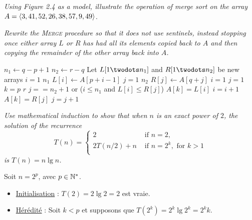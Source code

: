 \begin{description}
   {\itshape Using Figure 2.4 as a model, illustrate the operation of merge sort on the array $A =\\ \langle 3, 41, 52, 26, 38, 57, 9, 49\rangle$}.

    \begin{exrev}
      
    \end{exrev}

   {\itshape Rewrite the \textsc{Merge} procedure so that it does not use sentinels, instead stopping once either array $L$ or $R$ has had all its elements copied back to $A$ and then copying the remainder of the other array back into $A$.}

    \begin{ex}
      \begin{codebox}
        \li $n_1 \gets q - p + 1$
        \li $n_2 \gets r - q$
        \li Let $L[1\twodots n_1]$ and $R[1\twodots n_2]$ be new arrays
        \li \For $i = 1$ \To $n_1$ \Do
        \li $L[i] \gets A[p + i -1]$ \End
        \li \For $j = 1$ \To $n_2$ \Do
        \li $R[j] \gets A[q + j]$ \End
        \li $i = 1$
        \li $j = 1$
        \li \For $k = p$ \To $r$ \Do
        \li \If $ j == n_2+1$ or  ($i \le n_1$ and $L[i] \le R[j]$) \Then
        \li $A[k] = L[i]$
        \li $i = i+1$
        \li \Else 
        \li $A[k] = R[j]$
        \li $j = j+1$\End \End
      \end{codebox}
    \end{ex}

   {\itshape Use mathematical induction to show that when $n$ is an exact power of $2$, the solution of the recurrence 
    $$T(n) = \left\{
      \begin{array}{ll}
        2 & \text{ if } n = 2,\\
        2T(n/2)+n & \text{ if }n = 2^k, \text{ for } k> 1\\
      \end{array}
    \right.$$
  is $T(n) = n\lg n$.}

    \begin{ex}
      Soit $n = 2^p$, avec $p \in \mathbb{N}^*$.
      \begin{itemize}
        \item \ul{Initialisation} : $T(2) = 2\lg 2 = 2$ est vraie.
        \item \ul{H\'er\'edit\'e} : Soit $k < p$ et supposons que $T(2^k) = 2^k\lg 2^k = 2^kk$.


\end{itemize}
\end{ex}
\end{description}
